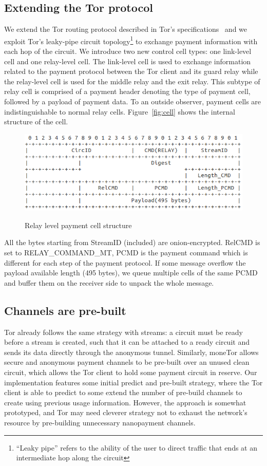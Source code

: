 
\subsection{Extending the Tor protocol}

We extend the Tor routing protocol described in Tor's
specifications~\cite{dingledine2018tor} and we exploit Tor's leaky-pipe circuit
topology\footnote{``Leaky pipe'' refers to the ability of the user to direct
  traffic that ends at an intermediate hop along the circuit} to exchange
payment information with each hop of the circuit. We introduce two new control
cell types: one link-level cell and one relay-level cell. The link-level cell is
used to exchange information related to the payment protocol between the Tor
client and its guard relay while the relay-level cell is used for the middle
relay and the exit relay. This subtype of relay cell is comprised of a payment
header denoting the type of payment cell, followed by a payload of payment
data. To an outside observer, payment cells are indistinguishable to normal
relay cells. Figure~\ref{fig:cell} shows the internal structure of the cell.
\begin{figure}[h]
	\centering
	\includegraphics[scale=0.38]{images/payment_cell_header.png}
	\label{fig:relay_command_mt_structure}
	\caption{Relay level payment cell structure}
\end{figure}

All the bytes starting from StreamID (included) are onion-encrypted. RelCMD is set to RELAY\_COMMAND\_MT, PCMD is the payment command which is different for each step of the payment protocol. If some message overflow the payload available length (495 bytes), we queue multiple cells of the same PCMD and buffer them on the receiver side to unpack the whole message.

\subsection{Channels are pre-built}
Tor already follows the
same strategy with streams: a circuit must be ready before a stream is created,
such that it can be attached to a ready circuit and sends its data directly
through the anonymous tunnel. Similarly, moneTor allows secure and anonymous
payment channels to be pre-built over an unused clean circuit, which allows the Tor client to hold some payment circuit in reserve. Our implementation features some initial predict and pre-built strategy, where the Tor client is able to predict to some extend the number of pre-build channels to create using previous usage information. However, the approach is somewhat prototyped, and Tor may need cleverer strategy not to exhaust the network's resource by pre-building unnecessary nanopayment channels.

